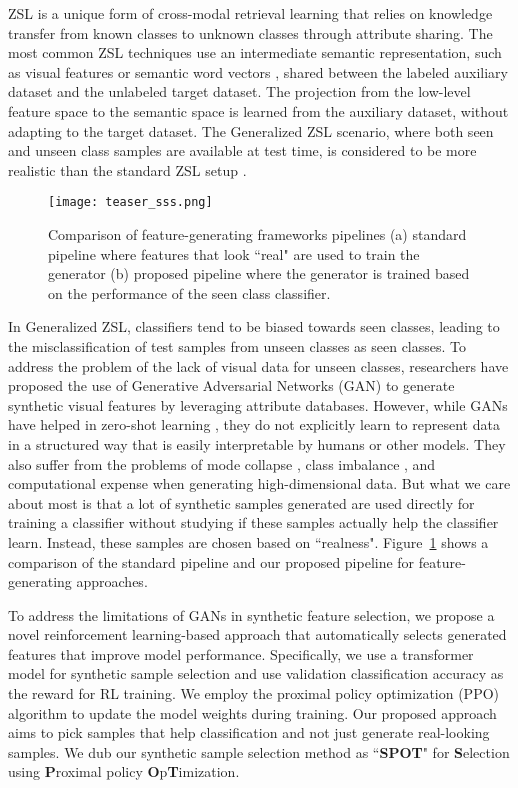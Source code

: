 \documentclass[10pt,twocolumn,letterpaper]{article}
\begin{document}
ZSL is a unique form of cross-modal retrieval learning that relies on knowledge transfer from known classes to unknown classes through attribute sharing. The most common ZSL techniques use an intermediate semantic representation, such as visual features or semantic word vectors \cite{socher2013zero,frome2013devise,ye2017zero,kodirov2017semantic}, shared between the labeled auxiliary dataset and the unlabeled target dataset. The projection from the low-level feature space to the semantic space is learned from the auxiliary dataset, without adapting to the target dataset. The Generalized ZSL scenario, where both seen and unseen class samples are available at test time, is considered to be more realistic than the standard ZSL setup \cite{xian2018zero}.

\begin{figure}[t]
    \centering
    \texttt{[image: teaser\_sss.png]}
    \caption{Comparison of feature-generating frameworks pipelines (a) standard pipeline where features that look ``real" are used to train the generator (b) proposed pipeline where the generator is trained based on the performance of the seen class classifier. }
    \label{fig:teaser}
\end{figure}

In Generalized ZSL, classifiers tend to be biased towards seen classes, leading to the misclassification of test samples from unseen classes as seen classes. To address the problem of the lack of visual data for unseen classes, researchers have proposed the use of Generative Adversarial Networks (GAN) \cite{goodfellow2020generative} to generate synthetic visual features by leveraging attribute databases. However, while GANs have helped in zero-shot learning \cite{verma2018generalized,clswgan,yu2020episode,cyclewgan}, they do not explicitly learn to represent data in a structured way that is easily interpretable by humans or other models. They also suffer from the problems of mode collapse \cite{jahaniansteerability}, class imbalance \cite{arora2017gans}, and computational expense \cite{guo2019deep} when generating high-dimensional data. But what we care about most is that a lot of synthetic samples generated are used directly for training a classifier without studying if these samples actually help the classifier learn. Instead, these samples are chosen based on ``realness". Figure~\ref{fig:teaser} shows a comparison of the standard pipeline and our proposed pipeline for feature-generating approaches.

To address the limitations of GANs in synthetic feature selection, we propose a novel reinforcement learning-based approach that automatically selects generated features that improve model performance. Specifically, we use a transformer model \cite{vaswani2017attention} for synthetic sample selection and use validation classification accuracy as the reward for RL training. We employ the proximal policy optimization (PPO) \cite{ppo} algorithm to update the model weights during training. Our proposed approach aims to pick samples that help classification and not just generate real-looking samples. We dub our synthetic sample selection method as ``\textbf{SPOT}" for \textbf{S}election using \textbf{P}roximal policy \textbf{O}p\textbf{T}imization.
\end{document}
